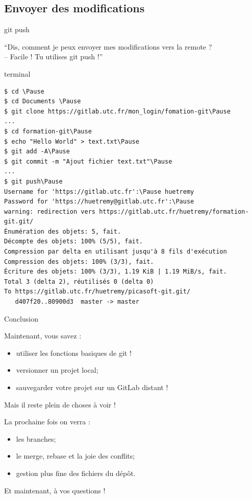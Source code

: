 \documentclass[usepdftitle=false]{beamer}
\def\seplength{.3\topsep}
\newcommand{\Pause}{%
\ifdef{\Release}
  {\pause}
  {}
}
\begin{document}
\subsection{Envoyer des modifications}

\begin{frame}[fragile]{git push}
	\begin{block}{}
		\enquote{Dis, comment je peux envoyer mes modifications vers la remote ? \\ -- Facile ! Tu utilises git push !}
	\end{block}
	\begin{beamercolorbox}[rounded=true,shadow=true]{terminal}
		\vspace{-\seplength}
		\begin{Verbatim}
$ cd \Pause
$ cd Documents \Pause
$ git clone https://gitlab.utc.fr/mon_login/fomation-git\Pause
...
$ cd formation-git\Pause
$ echo "Hello World" > text.txt\Pause
$ git add -A\Pause
$ git commit -m "Ajout fichier text.txt"\Pause
...
$ git push\Pause
Username for 'https://gitlab.utc.fr':\Pause huetremy
Password for 'https://huetremy@gitlab.utc.fr':\Pause
warning: redirection vers https://gitlab.utc.fr/huetremy/formation-git.git/
Énumération des objets: 5, fait.
Décompte des objets: 100% (5/5), fait.
Compression par delta en utilisant jusqu'à 8 fils d'exécution
Compression des objets: 100% (3/3), fait.
Écriture des objets: 100% (3/3), 1.19 KiB | 1.19 MiB/s, fait.
Total 3 (delta 2), réutilisés 0 (delta 0)
To https://gitlab.utc.fr/huetremy/picasoft-git.git/
   d407f20..80900d3  master -> master
		\end{Verbatim}
	\end{beamercolorbox}
\end{frame}

\begin{frame}{Conclusion}

	Maintenant, vous savez :
	\begin{itemize}
		\item utiliser les fonctions basiques de git !
		\item versionner un projet local;
		\item sauvegarder votre projet sur un GitLab distant !
	\end{itemize}

	\vfill

	Mais il reste plein de choses à voir !

	\vfill

	La prochaine fois on verra :
	\begin{itemize}
		\item les branches;
		\item le merge, rebase et la joie des conflits;
		\item gestion plus fine des fichiers du dépôt.
	\end{itemize}

	\vfill

	Et maintenant, à vos questions !

\end{frame}
\end{document}
